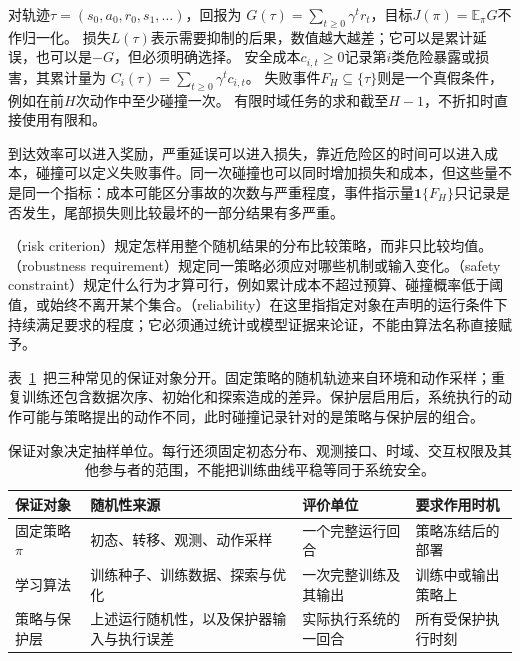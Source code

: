 \begin{definition}[回报、损失、成本与失败事件]
  \label{def:rl-trustworthy-objects}
  对轨迹$\tau=(s_0,a_0,r_0,s_1,\ldots)$，回报为
  $G(\tau)=\sum_{t\geq0}\gamma^t r_t$，目标$J(\pi)=\mathbb E_\pi G$不作归一化。
  损失$L(\tau)$表示需要抑制的后果，数值越大越差；它可以是累计延误，也可以是$-G$，但必须明确选择。
  安全成本$c_{i,t}\geq0$记录第$i$类危险暴露或损害，其累计量为
  $C_i(\tau)=\sum_{t\geq0}\gamma^t c_{i,t}$。
  失败事件$F_H\subseteq\{\tau\}$则是一个真假条件，例如在前$H$次动作中至少碰撞一次。
  有限时域任务的求和截至$H-1$，不折扣时直接使用有限和。
\end{definition}

到达效率可以进入奖励，严重延误可以进入损失，靠近危险区的时间可以进入成本，碰撞可以定义失败事件。同一次碰撞也可以同时增加损失和成本，但这些量不是同一个指标：成本可能区分事故的次数与严重程度，事件指示量$\mathbf 1\{F_H\}$只记录是否发生，尾部损失则比较最坏的一部分结果有多严重。

（risk criterion）规定怎样用整个随机结果的分布比较策略，而非只比较均值。（robustness requirement）规定同一策略必须应对哪些机制或输入变化。（safety constraint）规定什么行为才算可行，例如累计成本不超过预算、碰撞概率低于阈值，或始终不离开某个集合。（reliability）在这里指指定对象在声明的运行条件下持续满足要求的程度；它必须通过统计或模型证据来论证，不能由算法名称直接赋予。

表~\ref{tab:rl-trustworthy-guarantee-objects}~把三种常见的保证对象分开。固定策略的随机轨迹来自环境和动作采样；重复训练还包含数据次序、初始化和探索造成的差异。保护层启用后，系统执行的动作可能与策略提出的动作不同，此时碰撞记录针对的是策略与保护层的组合。

\begin{table}[htbp]
  \centering
  \begin{tabularx}{\linewidth}{@{}>{\raggedright\arraybackslash}p{20mm}XXX@{}}
    \toprule
    保证对象 & 随机性来源 & 评价单位 & 要求作用时机 \\
    \midrule
    固定策略$\pi$ & 初态、转移、观测、动作采样 & 一个完整运行回合 & 策略冻结后的部署 \\
    学习算法 & 训练种子、训练数据、探索与优化 & 一次完整训练及其输出 & 训练中或输出策略上 \\
    策略与保护层 & 上述运行随机性，以及保护器输入与执行误差 & 实际执行系统的一回合 & 所有受保护执行时刻 \\
    \bottomrule
  \end{tabularx}
  \caption{保证对象决定抽样单位。每行还须固定初态分布、观测接口、时域、交互权限及其他参与者的范围，不能把训练曲线平稳等同于系统安全。}
  \label{tab:rl-trustworthy-guarantee-objects}
\end{table}


